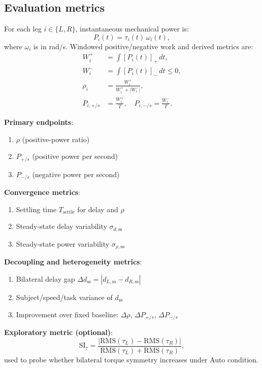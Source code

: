 \documentclass[lettersize,journal]{IEEEtran}
\begin{document}
\subsection{Evaluation metrics}
For each leg $i\in\{L,R\}$, instantaneous mechanical power is:
\begin{equation}
P_i(t)=\tau_i(t)\,\omega_i(t),
\end{equation}
where $\omega_i$ is in rad/s.
Windowed positive/negative work and derived metrics are:
\begin{align}
W_i^+ &= \int [P_i(t)]_+\,dt, \\
W_i^- &= \int [P_i(t)]_-\,dt \le 0, \\
\rho_i &= \frac{W_i^+}{W_i^+ + |W_i^-|}, \\
P_{i,+/s} &= \frac{W_i^+}{T}, \quad P_{i,-/s} = \frac{W_i^-}{T}.
\end{align}

\textbf{Primary endpoints}:
\begin{enumerate}
\item $\rho$ (positive-power ratio)
\item $P_{+/s}$ (positive power per second)
\item $P_{-/s}$ (negative power per second)
\end{enumerate}

\textbf{Convergence metrics}:
\begin{enumerate}
\item Settling time $T_{\text{settle}}$ for delay and $\rho$
\item Steady-state delay variability $\sigma_{d,\text{ss}}$
\item Steady-state power variability $\sigma_{\rho,\text{ss}}$
\end{enumerate}

\textbf{Decoupling and heterogeneity metrics}:
\begin{enumerate}
\item Bilateral delay gap $\Delta d_{\text{ss}} = |d_{L,\text{ss}} - d_{R,\text{ss}}|$
\item Subject/speed/task variance of $d_{\text{ss}}$
\item Improvement over fixed baseline: $\Delta \rho$, $\Delta P_{+/s}$, $\Delta P_{-/s}$
\end{enumerate}

\textbf{Exploratory metric (optional)}:
\begin{equation}
\mathrm{SI}_{\tau}=\frac{\left|\mathrm{RMS}(\tau_L)-\mathrm{RMS}(\tau_R)\right|}
{\mathrm{RMS}(\tau_L)+\mathrm{RMS}(\tau_R)},
\end{equation}
used to probe whether bilateral torque symmetry increases under Auto condition.
\end{document}
